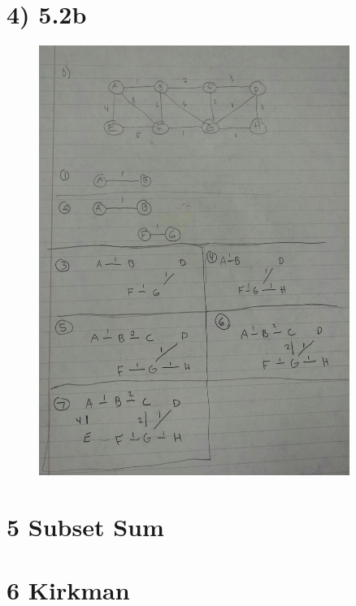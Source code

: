\documentclass[a4paper]{article}
\begin{document}
\section*{4) 5.2b}
\begin{figure}[H]
\centering
\includegraphics[width=0.9\textwidth]{Kruskal.jpg}
\end{figure}


\section*{5 Subset Sum}


\section*{6 Kirkman}


\end{document}
